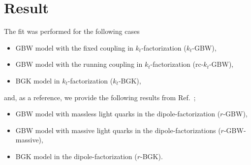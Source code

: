\documentclass[11pt]{article}
\numberwithin{equation}{section}
\numberwithin{table}{section}
\numberwithin{figure}{section}
\begin{document}
%
\section{Result}
%
The fit was performed for the following cases
\begin{itemize}
\item GBW model with the fixed coupling in $k_t$-factorization  ($k_t$-GBW),
\item GBW model with the running coupling in $k_t$-factorization (rc-$k_t$-GBW),
\item BGK model in $k_t$-factorization ($k_t$-BGK),
\end{itemize} 
and, as a reference, we provide the following results from Ref.~\cite{Goda:2022wsc};
\begin{itemize}
\item GBW model with massless light quarks in the dipole-factorization ($r$-GBW),
\item GBW model with massive light quarks in the dipole-factorizations ($r$-GBW-massive),
\item  BGK model in  the dipole-factorization ($r$-BGK).
\end{itemize} 
\end{document}
